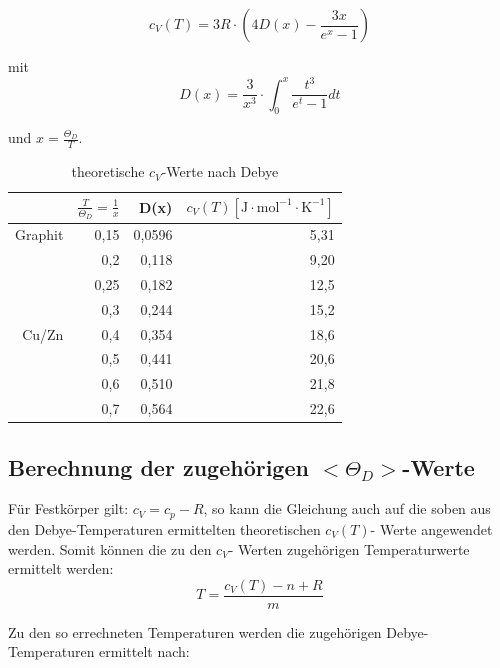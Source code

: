 \documentclass[12pt,a4paper,titlepage,headinclude,bibtotoc]{scrartcl}
\begin{document}
\begin{equation}
c_{V}(T)= 3R \cdot \left(4 D(x) - \frac{3x}{e^x -1}\right)
\end{equation}

mit \\

\begin{equation}
D(x) = \frac{3}{x^3}\cdot \int_{0}^{x} \frac{t^3}{e^t -1} dt
\end{equation}

und $x= \frac{\Theta_D}{T}$.


\begin{table} [h]
\centering
\caption{theoretische $c_V$-Werte nach Debye}
\begin{tabular} {r | r|  r | r}
&$\frac{T}{\Theta_D}=\frac{1}{x}$& D(x)&$c_V(T)[\mathrm{J}\cdot \mathrm{mol}^{-1} \cdot \mathrm{K}^{-1}]$\\
\hline
Graphit	&0,15&	0,0596	&5,31\\
	&0,2&	0,118	&9,20\\
	&0,25	&0,182&	12,5\\
	&0,3	&0,244	&15,2\\
	\hline			
Cu/Zn &	0,4	&0,354&	18,6\\
	&0,5&	0,441	&20,6\\
	&0,6	&0,510	&21,8\\
	&0,7&	0,564&22,6\\

\end{tabular}
\end{table}

\FloatBarrier

\subsection{Berechnung der zugehörigen $<\Theta_D>$-Werte }


Für Festkörper gilt: $c_V =c_p -R$, so kann die Gleichung auch auf die soben aus den Debye-Temperaturen ermittelten theoretischen $c_V(T)$- Werte angewendet werden. Somit können die zu den $c_V$- Werten zugehörigen Temperaturwerte ermittelt werden:\\

\begin{equation}
T= \frac{c_V(T) -n +R}{m}
\end{equation}

Zu den so errechneten Temperaturen werden die zugehörigen Debye-Temperaturen ermittelt nach:\\
\end{document}
